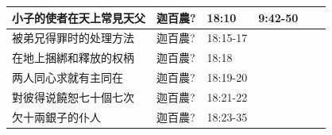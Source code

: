 \begin{table}[H]
\begin{tabular}{p{13.07em}|l|l|l|p{5.285em}|r}
小子的使者在天上常見天父& \multicolumn{1}{p{7.93em}|}{迦百農?} &\multicolumn{1}{p{5.285em}|}{18:10}&9:42-50&  &  \\\midrule


被弟兄得罪时的处理方法& \multicolumn{1}{p{7.93em}|}{迦百農?} &\multicolumn{1}{p{5.285em}|}{18:15-17}&&  &  \\\midrule

在地上捆綁和釋放的权柄& \multicolumn{1}{p{7.93em}|}{迦百農?} &\multicolumn{1}{p{5.285em}|}{18:18}&&  &  \\\midrule
两人同心求就有主同在& \multicolumn{1}{p{7.93em}|}{迦百農?} &\multicolumn{1}{p{5.285em}|}{18:19-20}&&  &  \\\midrule
對彼得说饒恕七十個七次& \multicolumn{1}{p{7.93em}|}{迦百農?} &\multicolumn{1}{p{5.285em}|}{18:21-22}&&  &  \\\midrule
欠十兩銀子的仆人& \multicolumn{1}{p{7.93em}|}{迦百農?} &\multicolumn{1}{p{5.285em}|}{18:23-35}&&  &  \\\midrule
\end{tabular}
\end{table}%




